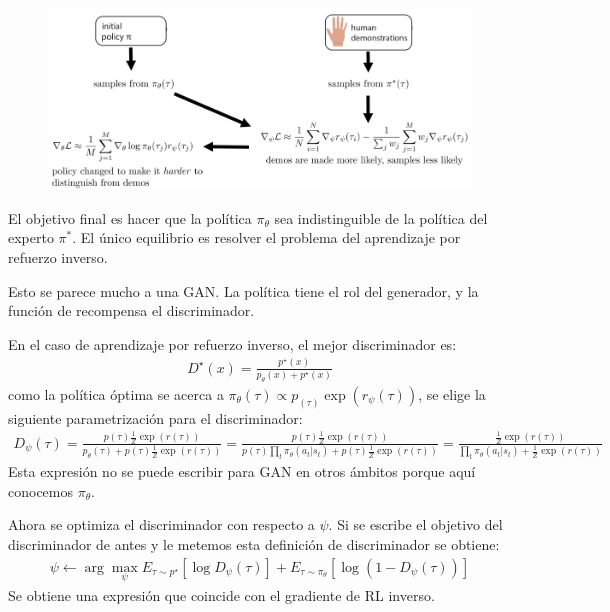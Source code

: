 \begin{figure}[H]
	\centering
	\includegraphics[width=0.8\linewidth]{figures/2020-07-06-161727_991x426_scrot.png}
\end{figure}

El objetivo final es hacer que la política $\pi_\theta$ sea indistinguible de la política del
experto $\pi^*$. El único equilibrio es resolver el problema del aprendizaje por refuerzo
inverso.

Esto se parece mucho a una GAN. La política tiene el rol del generador, y la función de
recompensa el discriminador.

En el caso de aprendizaje por refuerzo inverso, el mejor discriminador es:
\begin{align}
D ^ { \star } ( x ) = \frac { p ^ { \star } ( x ) } { p _ { \theta } ( x ) + p ^ { \star } ( x ) }
\end{align}
como la política óptima se acerca a $\pi_\theta(\tau)\propto
p_(\tau)\exp(r_\psi(\tau))$, se elige la siguiente parametrización para el discriminador:
\begin{align}
D _ { \psi } ( \tau ) = \frac { p ( \tau ) \frac { 1 } { Z } \operatorname { exp } ( r ( \tau ) )
} { p _ { \theta } ( \tau ) + p ( \tau ) \frac { 1 } { Z } \operatorname { exp } ( r ( \tau ) ) }
=
\frac { p ( \tau ) \frac { 1 } { Z } \operatorname { exp } ( r ( \tau ) ) } { p ( \tau ) \prod _ { t } \pi _ { \theta } ( a _ { t } | s _ { t } ) + p ( \tau ) \frac { 1 } { Z } \operatorname { exp } ( r ( \tau ) ) }
=
\frac { \frac { 1 } { Z } \operatorname { exp } ( r ( \tau ) ) } { \prod _ { t } \pi _ { \theta } ( a _ { t } | s _ { t } ) + \frac { 1 } { Z } \operatorname { exp } ( r ( \tau ) ) }
\end{align}
Esta expresión no se puede escribir para GAN en otros ámbitos porque aquí conocemos
$\pi_\theta$.

Ahora se optimiza el discriminador con respecto a $\psi$. Si se escribe el objetivo del
discriminador de antes y le metemos esta definición de discriminador se obtiene:
\begin{align}
\psi \leftarrow \operatorname { arg } \operatorname { max } _ { \psi } E _ { \tau \sim p ^ { \star } } [ \operatorname { log } D _ { \psi } ( \tau ) ] + E _ { \tau \sim \pi _ { \theta } } [ \operatorname { log } ( 1 - D _ { \psi } ( \tau ) ) ]
\end{align}
Se obtiene una expresión que coincide con el gradiente de RL inverso.

